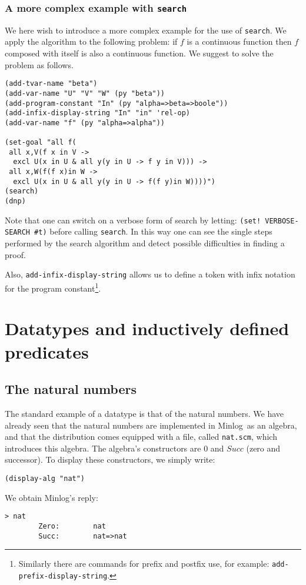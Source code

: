 \documentclass[12pt]{amsart}
\newcommand{\mi}{Minlog}
\begin{document}
\subsubsection{A more complex example with \texttt{search}}
We here wish to introduce a more complex example for the use of
\texttt{search}.  We apply the algorithm to the following problem: if
$f$ is a continuous function then $f$ composed with itself is also a
continuous function.  We suggest to solve the problem as follows.
\begin{verbatim}
(add-tvar-name "beta")
(add-var-name "U" "V" "W" (py "beta"))
(add-program-constant "In" (py "alpha=>beta=>boole"))
(add-infix-display-string "In" "in" 'rel-op)
(add-var-name "f" (py "alpha=>alpha"))

(set-goal "all f(
 all x,V(f x in V ->
  excl U(x in U & all y(y in U -> f y in V))) ->
 all x,W(f(f x)in W ->
  excl U(x in U & all y(y in U -> f(f y)in W))))")
(search)
(dnp)
\end{verbatim}
Note that one can switch on a verbose form of search by letting:
\texttt{(set! VERBOSE-SEARCH \#t)} before calling \texttt{search}. In
this way one can see the single steps performed by the search
algorithm and detect possible difficulties in finding a proof.

Also, \texttt{add-infix-display-string} allows us to define a token
with infix notation for the program constant\footnote{Similarly there
  are commands for prefix and postfix use, for example:
  \texttt{add-prefix-display-string}.}.


\section{Datatypes and inductively defined predicates}
\label{Datatypes}

\subsection{The natural numbers}
\label{NaturalNumbers}
The standard example of a datatype is that of the natural numbers.  We
have already seen that the natural numbers are implemented in \mi\ as
an algebra, and that the distribution comes equipped with a file,
called \texttt{nat.scm}, which introduces this algebra.  The algebra's
constructors are $0$ and $Succ$ (zero and successor).  To display
these constructors, we simply write:
\begin{verbatim}
(display-alg "nat")
\end{verbatim}
We obtain \mi's reply:
\begin{verbatim}
> nat
        Zero:        nat
        Succ:        nat=>nat
\end{verbatim}
\end{document}
